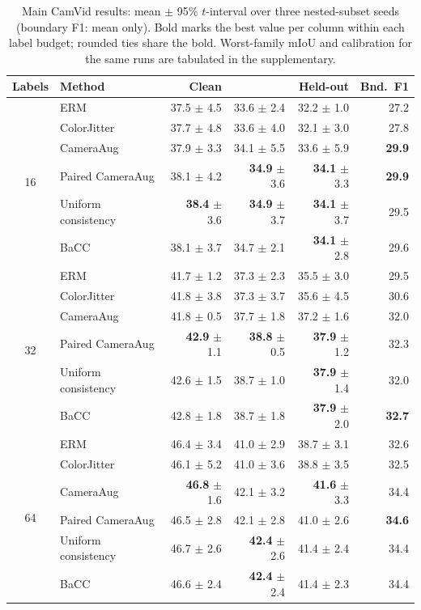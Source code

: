 \begin{table}[t]
\centering
\caption{Main CamVid results: mean $\pm$ 95\% $t$-interval over three nested-subset seeds (boundary F1: mean only). Bold marks the best value per column within each label budget; rounded ties share the bold. Worst-family mIoU and calibration for the same runs are tabulated in the supplementary.}
\label{tab:main}
\small
\setlength{\tabcolsep}{4.5pt}
\begin{tabular}{clrrrr}
\toprule
Labels & Method & Clean & \miouc{} & Held-out & Bnd.\ F1 \\
\midrule
\multirow{6}{*}{16} & ERM & 37.5 $\pm$ 4.5 & 33.6 $\pm$ 2.4 & 32.2 $\pm$ 1.0 & 27.2 \\
 & ColorJitter & 37.7 $\pm$ 4.8 & 33.6 $\pm$ 4.0 & 32.1 $\pm$ 3.0 & 27.8 \\
 & CameraAug & 37.9 $\pm$ 3.3 & 34.1 $\pm$ 5.5 & 33.6 $\pm$ 5.9 & \textbf{29.9} \\
 & Paired CameraAug & 38.1 $\pm$ 4.2 & \textbf{34.9} $\pm$ 3.6 & \textbf{34.1} $\pm$ 3.3 & \textbf{29.9} \\
 & Uniform consistency & \textbf{38.4} $\pm$ 3.6 & \textbf{34.9} $\pm$ 3.7 & \textbf{34.1} $\pm$ 3.7 & 29.5 \\
 & BaCC & 38.1 $\pm$ 3.7 & 34.7 $\pm$ 2.1 & \textbf{34.1} $\pm$ 2.8 & 29.6 \\
\midrule
\multirow{6}{*}{32} & ERM & 41.7 $\pm$ 1.2 & 37.3 $\pm$ 2.3 & 35.5 $\pm$ 3.0 & 29.5 \\
 & ColorJitter & 41.8 $\pm$ 3.8 & 37.3 $\pm$ 3.7 & 35.6 $\pm$ 4.5 & 30.6 \\
 & CameraAug & 41.8 $\pm$ 0.5 & 37.7 $\pm$ 1.8 & 37.2 $\pm$ 1.6 & 32.0 \\
 & Paired CameraAug & \textbf{42.9} $\pm$ 1.1 & \textbf{38.8} $\pm$ 0.5 & \textbf{37.9} $\pm$ 1.2 & 32.3 \\
 & Uniform consistency & 42.6 $\pm$ 1.5 & 38.7 $\pm$ 1.0 & \textbf{37.9} $\pm$ 1.4 & 32.0 \\
 & BaCC & 42.8 $\pm$ 1.8 & 38.7 $\pm$ 1.8 & \textbf{37.9} $\pm$ 2.0 & \textbf{32.7} \\
\midrule
\multirow{6}{*}{64} & ERM & 46.4 $\pm$ 3.4 & 41.0 $\pm$ 2.9 & 38.7 $\pm$ 3.1 & 32.6 \\
 & ColorJitter & 46.1 $\pm$ 5.2 & 41.0 $\pm$ 3.6 & 38.8 $\pm$ 3.5 & 32.5 \\
 & CameraAug & \textbf{46.8} $\pm$ 1.6 & 42.1 $\pm$ 3.2 & \textbf{41.6} $\pm$ 3.3 & 34.4 \\
 & Paired CameraAug & 46.5 $\pm$ 2.8 & 42.1 $\pm$ 2.8 & 41.0 $\pm$ 2.6 & \textbf{34.6} \\
 & Uniform consistency & 46.7 $\pm$ 2.6 & \textbf{42.4} $\pm$ 2.6 & 41.4 $\pm$ 2.4 & 34.4 \\
 & BaCC & 46.6 $\pm$ 2.4 & \textbf{42.4} $\pm$ 2.4 & 41.4 $\pm$ 2.3 & 34.4 \\
\bottomrule
\end{tabular}
\end{table}
